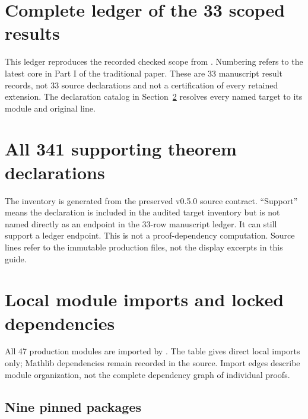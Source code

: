 \section{Complete ledger of the 33 scoped results}
\label{sec:ledger}
This ledger reproduces the recorded checked scope from . Numbering refers to the latest core in Part I of the traditional paper. These are 33 manuscript result records, not 33 source declarations and not a certification of every retained extension. The declaration catalog in Section~\ref{sec:catalog} resolves every named target to its module and original line.

\clearpage
\section{All 341 supporting theorem declarations}
\label{sec:catalog}
The inventory is generated from the preserved v0.5.0 source contract. ``Support'' means the declaration is included in the audited target inventory but is not named directly as an endpoint in the 33-row manuscript ledger. It can still support a ledger endpoint. This is not a proof-dependency computation. Source lines refer to the immutable production files, not the display excerpts in this guide.

\clearpage
\section{Local module imports and locked dependencies}
\label{sec:imports}
All 47 production modules are imported by . The table gives direct local imports only; Mathlib dependencies remain recorded in the source. Import edges describe module organization, not the complete dependency graph of individual proofs.

\subsection{Nine pinned packages}


